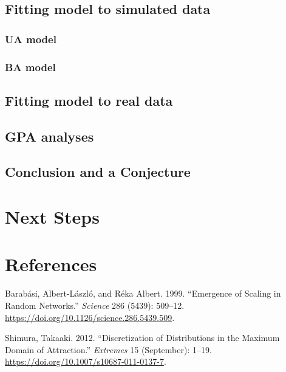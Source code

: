 \documentclass[
  10pt,
  a4paper,
]{scrreprt}
\newlength{\cslhangindent}
\newlength{\cslentryspacingunit} %
\newenvironment{CSLReferences}[2] %
 {%
  \setlength{\parindent}{0pt}
  \ifodd #1
  \let\oldpar\par
  \def\par{\hangindent=\cslhangindent\oldpar}
  \fi
  \setlength{\parskip}{#2\cslentryspacingunit}
 }%
 {}
\theoremstyle{plain}
\theoremstyle{definition}
\theoremstyle{remark}
\begin{document}
{\hypertarget{fitting-model-to-simulated-data}{%
\section{Fitting model to simulated
data}\label{fitting-model-to-simulated-data}}

\hypertarget{ua-model}{%
\subsection{UA model}\label{ua-model}}

\hypertarget{ba-model}{%
\subsection{BA model}\label{ba-model}}

\hypertarget{fitting-model-to-real-data}{%
\section{Fitting model to real data}\label{fitting-model-to-real-data}}

\hypertarget{gpa-analyses}{%
\section{GPA analyses}\label{gpa-analyses}}

\hypertarget{conclusion-and-a-conjecture}{%
\section{Conclusion and a
Conjecture}\label{conclusion-and-a-conjecture}}

\hypertarget{next-steps}{%
\chapter{Next Steps}\label{next-steps}}

\newpage{}

\hypertarget{references}{%
\chapter*{References}\label{references}}

\hypertarget{refs}{}
\begin{CSLReferences}{1}{0}
\leavevmode{}%
Barabási, Albert-László, and Réka Albert. 1999. {``Emergence of Scaling
in Random Networks.''} \emph{Science} 286 (5439): 509--12.
\url{https://doi.org/10.1126/science.286.5439.509}.

\leavevmode{}%
Shimura, Takaaki. 2012. {``Discretization of Distributions in the
Maximum Domain of Attraction.''} \emph{Extremes} 15 (September): 1--19.
\url{https://doi.org/10.1007/s10687-011-0137-7}.

\end{CSLReferences}
\end{document}
